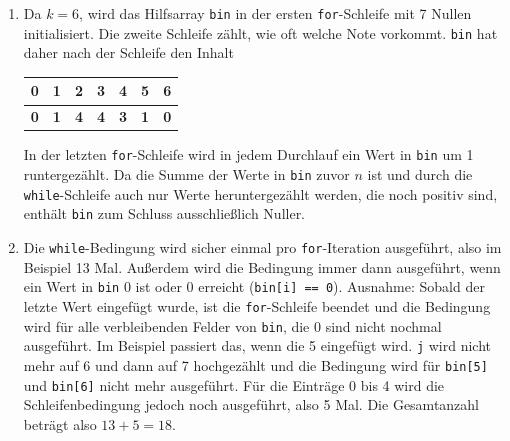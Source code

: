 \documentclass[11pt,a4paper]{article}
\begin{document}
\begin{loesung}
    \begin{enumerate}
        \item
        Da $k = 6$, wird das Hilfsarray \texttt{bin} in der ersten \texttt{for}-Schleife mit 7 Nullen initialisiert.
        Die zweite Schleife zählt, wie oft welche Note vorkommt.
        \texttt{bin} hat daher nach der Schleife den Inhalt
        \begin{table}[h!]
            \centering
            \begin{tabular}{|c|c|c|c|c|c|c|}
                \hline
                0 & 1 & 2 & 3 & 4 & 5 & 6 \\ \hline
                \textbf{0} & \textbf{1} & \textbf{4} & \textbf{4} & \textbf{3} & \textbf{1} & \textbf{0} \\ \hline
            \end{tabular}
        \end{table}
        \FloatBarrier
        In der letzten \texttt{for}-Schleife wird in jedem Durchlauf ein Wert in \texttt{bin} um 1 runtergezählt.
        Da die Summe der Werte in \texttt{bin} zuvor $n$ ist und durch die \texttt{while}-Schleife auch nur Werte heruntergezählt werden, die noch positiv sind, enthält \texttt{bin} zum Schluss ausschließlich Nuller.

        \item
        Die \texttt{while}-Bedingung wird sicher einmal pro \texttt{for}-Iteration ausgeführt, also im Beispiel 13 Mal.
        Außerdem wird die Bedingung immer dann ausgeführt, wenn ein Wert in \texttt{bin} 0 ist oder 0 erreicht (\texttt{bin[i] == 0}).
        Ausnahme: Sobald der letzte Wert eingefügt wurde, ist die \texttt{for}-Schleife beendet und die Bedingung wird für alle verbleibenden Felder von \texttt{bin}, die 0 sind nicht nochmal ausgeführt.
        Im Beispiel passiert das, wenn die 5 eingefügt wird.
        \texttt{j} wird nicht mehr auf 6 und dann auf 7 hochgezählt und die Bedingung wird für \texttt{bin[5]} und \texttt{bin[6]} nicht mehr ausgeführt.
        Für die Einträge 0 bis 4 wird die Schleifenbedingung jedoch noch ausgeführt, also 5 Mal.
        Die Gesamtanzahl beträgt also $13 + 5 = 18$.
    \end{enumerate}
\end{loesung}
\end{document}
